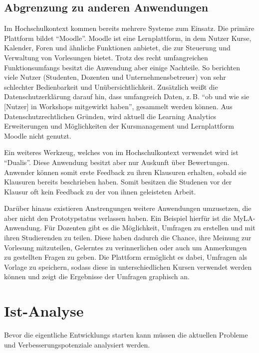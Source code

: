 \subsection{Abgrenzung zu anderen Anwendungen}
Im Hochschulkontext kommen bereits mehrere Systeme zum Einsatz.
Die primäre Plattform bildet \enquote{Moodle}.
Moodle ist eine Lernplattform, in dem Nutzer Kurse, Kalender, Foren und ähnliche Funktionen anbietet, die zur Steuerung und Verwaltung von Vorlesungen bietet.
Trotz des recht umfangreichen Funktionsumfangs besitzt die Anwendung aber einige Nachteile.
So berichten viele Nutzer (Studenten, Dozenten und Unternehmensbetreuer) von sehr schlechter Bedienbarkeit und Unübersichtlichkeit.
Zusätzlich weißt die Datenschutzerklärung darauf hin, dass umfangreich Daten, z.\,B. \enquote{ob und wie sie [Nutzer] in Workshops mitgewirkt haben}, gesammelt werden können.\autocites{moodleTermsOfServiceDHBW}{moodleTermsOfService}
Aus Datenschutzrechtlichen Gründen, wird aktuell die Learning Analytics Erweiterungen und Möglichkeiten der Kursmanagement und Lernplattform Moodle nicht genutzt.

Ein weiteres Werkzeug, welches von im Hochschulkontext verwendet wird ist \enquote{Dualis}.
Diese Anwendung besitzt aber nur Auskunft über Bewertungen.
Anwender können somit erste Feedback zu ihren Klausuren erhalten, sobald sie Klausuren bereits beschrieben haben.
Somit besitzen die Studenen vor der Klausur oft kein Feedback zu der von ihnen geleisteten Arbeit.

Darüber hinaus existieren Anstrengungen weitere Anwendungen umzusetzen, die aber nicht den Prototypstatus verlassen haben.
Ein Beispiel hierfür ist die MyLA-Anwendung.\autocite{mylaGithub}
Für Dozenten gibt es die Möglichkeit, Umfragen zu erstellen und mit ihren Studierenden zu teilen.
Diese haben dadurch die Chance, ihre Meinung zur Vorlesung mitzuteilen, Gelerntes zu verinnerlichen oder auch um Anmerkungen zu gestellten Fragen zu geben.
Die Plattform ermöglicht es dabei, Umfragen als Vorlage zu speichern, sodass diese in unterschiedlichen Kursen verwendet werden können und zeigt die Ergebnisse der Umfragen graphisch an.




\section{Ist-Analyse} %
Bevor die eigentliche Entwicklungs starten kann müssen die aktuellen Probleme und Verbesserungspotenziale analysiert werden.

